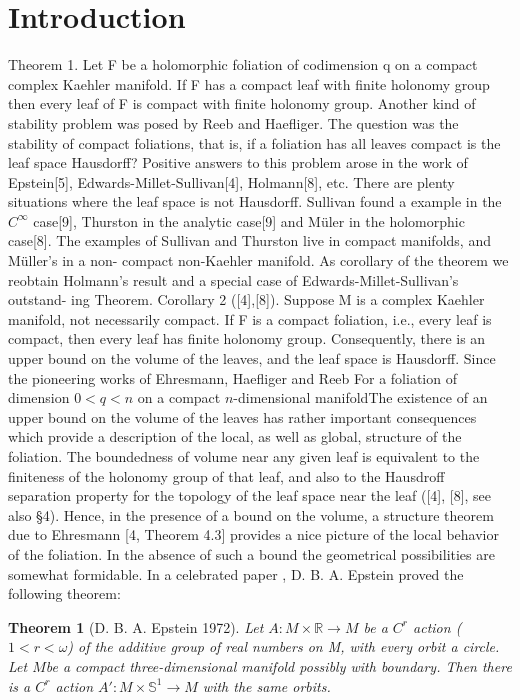 \documentclass[A4paper,11pt]{amsart}
\newcommand{\R}{\mathbb{R}}
\newcommand{\sS}{\mathbb{S}}
\newtheorem{theorem}{Theorem}
\theoremstyle{definition}
\theoremstyle{named}
\begin{document}
\section{Introduction} \label{introduction}
Theorem 1. Let F be a holomorphic foliation of codimension q on a compact complex Kaehler manifold. If F has a compact leaf with finite holonomy group then every leaf of F is compact with finite holonomy group.
Another kind of stability problem was posed by Reeb and Haefliger. The question was the stability of compact foliations, that is, if a foliation has all leaves compact is the leaf space Hausdorff? Positive answers to
this problem arose in the work of Epstein[5], Edwards-Millet-Sullivan[4], Holmann[8], etc. There are plenty situations where the leaf space is not Hausdorff. Sullivan found a example in the $C^\infty$ case[9], Thurston in the analytic case[9] and Müler in the holomorphic case[8]. The examples of Sullivan and Thurston live in compact manifolds, and Müller’s in a non- compact non-Kaehler manifold. As corollary of the theorem we reobtain Holmann’s result and a special case of Edwards-Millet-Sullivan’s outstand- ing Theorem.
Corollary 2 ([4],[8]). Suppose M is a complex Kaehler manifold, not necessarily compact. If F is a compact foliation, i.e., every leaf is compact, then every leaf has finite holonomy group. Consequently, there is an upper bound on the volume of the leaves, and the leaf space is Hausdorff.
Since the pioneering works of Ehresmann,  Haefliger and Reeb For a foliation of dimension $0<q<n$ on a compact $n$-dimensional manifoldThe existence of an upper bound on the volume of the leaves has rather important consequences which provide a description of the local, as well as global, structure of the foliation. The boundedness of volume near any given leaf is equivalent to the finiteness of the holonomy group of that leaf, and also to the Hausdroff separation property for the topology of the leaf space near the leaf ([4], [8], see also §4). Hence, in the presence of a bound on the volume, a structure theorem due to Ehresmann [4, Theorem 4.3] provides a nice picture of the local behavior of the foliation. In the absence of such a bound the geometrical possibilities are somewhat formidable.
In a celebrated paper \cite{Ep2}, D. B. A. Epstein proved the following theorem:
\begin{theorem}[D. B. A. Epstein 1972] Let $A: M \times \R\rightarrow{M}$ be a $C^r$ action 
($1 < r < \omega$) of the additive group of real numbers on M, with every orbit a circle. Let $M $be a compact three-dimensional manifold possibly with boundary. Then there is a $C^r $ action
$A': M \times \sS^1\to{M}$ with the same orbits.
\end{theorem} 
\end{document}
